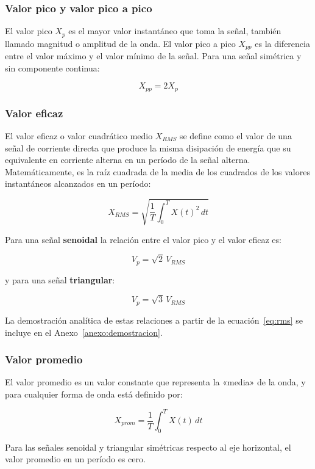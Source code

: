 \documentclass{article}
\begin{document}
    \subsubsection{Valor pico y valor pico a pico}

    El valor pico $X_p$ es el mayor valor instantáneo que toma la señal, también llamado magnitud o amplitud de la onda. El valor pico a pico $X_{pp}$ es la diferencia entre el valor máximo y el valor mínimo de la señal. Para una señal simétrica y sin componente continua:

    \[
        X_{pp} = 2X_p
    \]

    \subsubsection{Valor eficaz}

    El valor eficaz o valor cuadrático medio $X_{RMS}$ se define como el valor de una señal de corriente directa que produce la misma disipación de energía que su equivalente en corriente alterna en un período de la señal alterna. Matemáticamente, es la raíz cuadrada de la media de los cuadrados de los valores instantáneos alcanzados en un período:

    \begin{equation}
        X_{RMS} = \sqrt{\frac{1}{T}\int_{0}^{T} X(t)^2\,dt}\label{eq:rms}
    \end{equation}

    Para una señal \textbf{senoidal} la relación entre el valor pico y el valor eficaz es:

    \[
        V_p = \sqrt{2}\,V_{RMS}
    \]

    y para una señal \textbf{triangular}:

    \[
        V_p = \sqrt{3}\,V_{RMS}
    \]

    La demostración analítica de estas relaciones a partir de la ecuación~\eqref{eq:rms} se incluye en el Anexo~\ref{anexo:demostracion}.

    \subsubsection{Valor promedio}

    El valor promedio es un valor constante que representa la «media» de la onda, y para cualquier forma de onda está definido por:

    \[
        X_{prom} = \frac{1}{T}\int_{0}^{T} X(t)\,dt
    \]

    Para las señales senoidal y triangular simétricas respecto al eje horizontal, el valor promedio en un período es cero.
\end{document}
